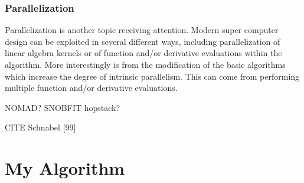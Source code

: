 \documentclass{article}
\begin{document}

%
%



\subsubsection{Parallelization}

Parallelization is another topic receiving attention.
Modern super computer design can be exploited in several different ways, including parallelization of linear algebra kernels or of function and/or derivative evaluations within the algorithm.
More interestingly is from the modification of the basic algorithms which increase the degree of intrinsic parallelism.
This can come from performing multiple function and/or derivative evaluations.


NOMAD?
SNOBFIT
hopstack?

CITE
Schnabel [99]




\section{My Algorithm}
\end{document}
